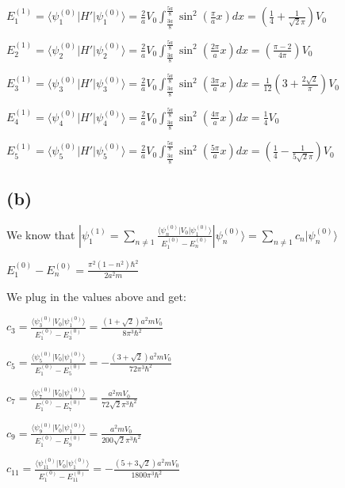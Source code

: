 \documentclass[12pt]{article}
\begin{document}
\begin{spacing}{2.0}
$E_1^{(1)}=\langle \psi_1^{(0)}|H'|\psi_1^{(0)} \rangle = \frac{2}{a}V_0 \int_{\frac{3a}{8}}^{\frac{5a}{8}} \sin^2(\frac{\pi}{a}x) dx= \boxed{(\frac{1}{4}+\frac{1}{\sqrt{2} \pi })V_0}$

$E_2^{(1)}=\langle \psi_2^{(0)}|H'|\psi_2^{(0)} \rangle =\frac{2}{a}V_0 \int_{\frac{3a}{8}}^{\frac{5a}{8}} \sin^2(\frac{2\pi}{a}x) dx= \boxed{(\frac{\pi -2}{4 \pi })V_0}$

$E_3^{(1)}=\langle \psi_3^{(0)}|H'|\psi_3^{(0)} \rangle= \frac{2}{a}V_0 \int_{\frac{3a}{8}}^{\frac{5a}{8}} \sin^2(\frac{3\pi}{a}x) dx= \boxed{\frac{1}{12} \left(3+\frac{2 \sqrt{2}}{\pi }\right)V_0}$

$E_4^{(1)}=\langle \psi_4^{(0)}|H'|\psi_4^{(0)} \rangle= \frac{2}{a}V_0 \int_{\frac{3a}{8}}^{\frac{5a}{8}} \sin^2(\frac{4\pi}{a}x) dx= \boxed{\frac{1}{4}V_0}$

$E_5^{(1)}=\langle \psi_5^{(0)}|H'|\psi_5^{(0)} \rangle =\frac{2}{a}V_0 \int_{\frac{3a}{8}}^{\frac{5a}{8}} \sin^2(\frac{5\pi}{a}x) dx= \boxed{(\frac{1}{4}-\frac{1}{5 \sqrt{2} \pi })V_0}$

\subsection*{(b)}
We know that $|\psi_1^{(1)}= \sum_{n\ne 1} \frac{\langle \psi_n^{(0)}|V_0|\psi_1^{(0)} \rangle}{E_1^{(0)} -E_n^{(0)}} |\psi_n^{(0)}\rangle= \sum_{n\ne 1} c_n |\psi_n^{(0)}\rangle$

$E_1^{(0)}- E_n^(0)= \frac{\pi ^2 \left(1-n^2\right) \hbar ^2}{2 a^2 m}$

We plug in the values above and get:

$c_3= \frac{\langle \psi_3^{(0)}|V_0|\psi_1^{(0)} \rangle}{E_1^{(0)} -E_3^{(0)}}=\boxed{ \frac{\left(1+\sqrt{2}\right) a^2 m V_0}{8 \pi ^3 \hbar ^2} }$

$c_5= \frac{\langle \psi_5^{(0)}|V_0|\psi_1^{(0)} \rangle}{E_1^{(0)} -E_5^{(0)}}=\boxed{-\frac{\left(3+\sqrt{2}\right) a^2 m V_0}{72 \pi ^3 \hbar ^2}}$

$c_7= \frac{\langle \psi_7^{(0)}|V_0|\psi_1^{(0)} \rangle}{E_1^{(0)} -E_7^{(0)}}=\boxed{\frac{a^2 m V_0}{72 \sqrt{2} \pi ^3 \hbar ^2}}$

$c_9= \frac{\langle \psi_9^{(0)}|V_0|\psi_1^{(0)} \rangle}{E_1^{(0)} -E_9^{(0)}}=\boxed{\frac{a^2 m V_0}{200 \sqrt{2} \pi ^3 \hbar ^2}}$

$c_{11}= \frac{\langle \psi_{11}^{(0)}|V_0|\psi_1^{(0)} \rangle}{E_1^{(0)} -E_{11}^{(0)}}=\boxed{-\frac{\left(5+3 \sqrt{2}\right) a^2 m V_0}{1800 \pi ^3 \hbar ^2}}$


\end{spacing}
\end{document}
